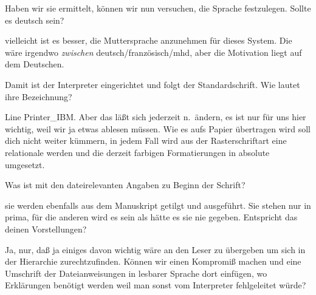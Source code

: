 \documentclass[
]{article}
\begin{document}
\begin{itemize}
  Haben wir sie ermittelt, können wir nun versuchen, die Sprache
  festzulegen. Sollte es deutsch sein?

  vielleicht ist es besser, die Muttersprache anzunehmen für dieses
  System. Die wäre irgendwo \emph{zwischen} deutsch/französisch/mhd,
  aber die Motivation liegt auf dem Deutschen.

  Damit ist der Interpreter eingerichtet und folgt der Standardschrift.
  Wie lautet ihre Bezeichnung?

  Line Printer\_IBM. Aber das läßt sich jederzeit n.~ändern, es ist nur
  für uns hier wichtig, weil wir ja etwas ablesen müssen. Wie es aufs
  Papier übertragen wird soll dich nicht weiter kümmern, in jedem Fall
  wird aus der Rasterschriftart eine relationale werden und die derzeit
  farbigen Formatierungen in absolute umgesetzt.

  Was ist mit den dateirelevanten Angaben zu Beginn der Schrift?

  sie werden ebenfalls aus dem Manuskript getilgt und ausgeführt. Sie
  stehen nur in prima, für die anderen wird es sein als hätte es sie nie
  gegeben. Entspricht das deinen Vorstellungen?

  Ja, nur, daß ja einiges davon wichtig wäre an den Leser zu übergeben
  um sich in der Hierarchie zurechtzufinden. Können wir einen Kompromiß
  machen und eine Umschrift der Dateianweisungen in lesbarer Sprache
  dort einfügen, wo Erklärungen benötigt werden weil man sonst vom
  Interpreter fehlgeleitet würde?


\end{itemize}
\end{document}
